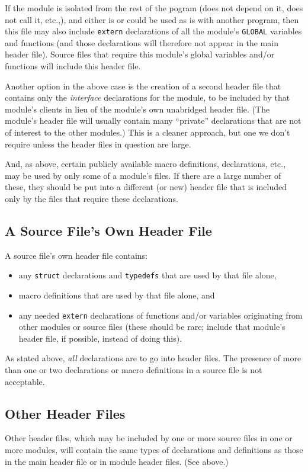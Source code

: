 If the module is isolated from the rest of the pogram (does not depend
on it, does not call it, etc.,), and either is or could be used as is
with another program, then this file may also include {\tt extern}
declarations of all the module's {\tt GLOBAL} variables and functions
(and those declarations will therefore not appear in the main header
file).  Source files that require this module's global variables
and/or functions will include this header file.

Another option in the above case is the creation of a second header
file that contains only the {\em interface} declarations for the
module, to be included by that module's clients in lieu of the
module's own unabridged header file.  (The module's header file will
usually contain many ``private'' declarations that are not of interest
to the other modules.)  This is a cleaner approach, but one we don't
require unless the header files in question are large.

And, as above, certain publicly available macro definitions,
declarations, etc., may be used by only some of a module's files.  If
there are a large number of these, they should be put into a different
(or new) header file that is included only by the files that require
these declarations.

\subsection{A Source File's Own Header File}
A source file's own header file contains:
\begin{itemize}
\item any {\tt struct} declarations and {\tt typedefs} that are used
by that file alone,
\item macro definitions that are used by that file
alone, and
\item any needed {\tt extern} declarations of functions and/or
variables originating from other modules or source files (these should
be rare; include that module's header file, if possible, instead of
doing this).
\end{itemize}

As stated above, {\em all} declarations are to go into header files.  The presence of more
than one or two declarations or macro definitions in a source file is not acceptable.

\subsection{Other Header Files}
Other header files, which may be included by one or more source files
in one or more modules, will contain the same types of declarations
and definitions as those in the main header file or in module header
files.  (See above.)

